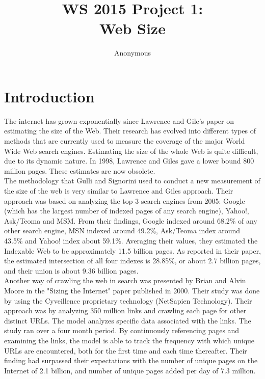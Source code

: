 \documentclass{sig-alternate}
\begin{document}
\title{WS 2015 Project 1:\\Web Size}
\author{
\alignauthor 
Anonymous
}
\maketitle



\section{Introduction}
The internet has grown exponentially since Lawrence and Gile's paper on estimating the size of the Web. Their research has evolved into different types of methods that are currently used to measure the coverage of the major World Wide Web search engines. Estimating the size of the whole Web is quite difficult, due to its dynamic nature. In 1998, Lawrence and Giles \cite{LawLee1998} gave a lower bound 800 million pages. These estimates are now obsolete.\\

The methodology that Gulli and Signorini \cite{Gul2005} used to conduct a new measurement of the size of the web is very similar to Lawrence and Giles approach. Their approach was based on analyzing the top 3 search engines from 2005: Google (which has the largest number of indexed pages of any search engine), Yahoo!, Ask/Teoma and MSM. From their findings, Google indexed around 68.2\% of any other search engine, MSN indexed around 49.2\%, Ask/Teoma index around 43.5\% and Yahoo! index about 59.1\%. Averaging their values, they estimated the Indexable Web to be approximately 11.5 billion pages. As reported in their paper, the estimated intersection of all four indexes is 28.85\%, or about 2.7 billion pages, and their union is about 9.36 billion pages. \\

Another way of crawling the web in search was presented by Brian and Alvin Moore in the "Sizing the Internet" paper published in 2000\cite{Mur2000}. Their study was done by using the Cyveillence proprietary technology (NetSapien Technology). Their approach was by analyzing 350 million links and crawling each page for other distinct URLs. The model analyzes specific data associated with the links. The study ran over a four month period. By continuously referencing pages and examining the links, the model is able to track the frequency with which unique URLs are encountered, both for the first time and each time thereafter. Their finding had surpassed their expectations with the number of unique pages on the Internet of 2.1 billion, and number of unique pages added per day of 7.3 million.\\
\end{document}
